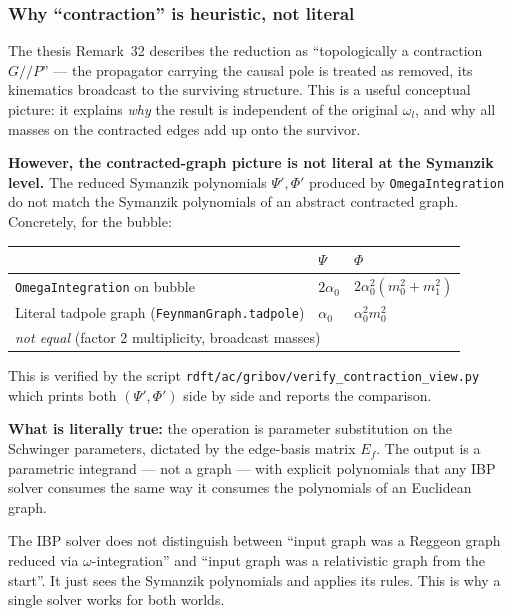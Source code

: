 \documentclass[11pt,a4paper]{article}
\theoremstyle{definition}
\theoremstyle{plain}
\begin{document}
\subsubsection{Why ``contraction'' is heuristic, not literal}

\begin{stdbox}
The thesis Remark~32 describes the reduction as ``topologically a
contraction $G //\!P$'' --- the propagator carrying the causal pole
is treated as removed, its kinematics broadcast to the surviving
structure.  This is a useful conceptual picture: it explains \emph{why}
the result is independent of the original $\omega_l$, and why all
masses on the contracted edges add up onto the survivor.

\textbf{However, the contracted-graph picture is not literal at the
Symanzik level.}  The reduced Symanzik polynomials $\Psi', \Phi'$
produced by \texttt{OmegaIntegration} do not match the Symanzik
polynomials of an abstract contracted graph.  Concretely, for the
bubble:
\begin{center}\small
\begin{tabular}{@{}lll@{}}
\toprule
& $\Psi$ & $\Phi$\\
\midrule
\texttt{OmegaIntegration} on bubble & $2\alpha_0$ & $2\alpha_0^2(m_0^2 + m_1^2)$\\
Literal tadpole graph (\texttt{FeynmanGraph.tadpole}) & $\alpha_0$ & $\alpha_0^2 m_0^2$\\
\midrule
\multicolumn{3}{l}{\emph{not equal} (factor 2 multiplicity, broadcast masses)}\\
\bottomrule
\end{tabular}
\end{center}
This is verified by the script
\texttt{rdft/ac/gribov/verify\_contraction\_view.py} which prints both
$(\Psi', \Phi')$ side by side and reports the comparison.

\textbf{What is literally true:} the operation is parameter
substitution on the Schwinger parameters, dictated by the edge-basis
matrix $E_f$.  The output is a parametric integrand --- not a graph
--- with explicit polynomials that any IBP solver consumes the same
way it consumes the polynomials of an Euclidean graph.

The IBP solver does not distinguish between ``input graph was a
Reggeon graph reduced via $\omega$-integration'' and ``input graph
was a relativistic graph from the start''.  It just sees the
Symanzik polynomials and applies its rules.  This is why a single
solver works for both worlds.
\end{stdbox}
\end{document}
